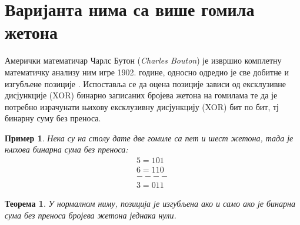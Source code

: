 \documentclass[a4paper]{article}
\newtheorem{example}{Пример}
\newtheorem{theorem}{Теорема}
\begin{document}
\section{Варијанта нима са више гомила жетона}
\label{sec:optimalna_strategija}

Амерички математичар Чарлс Бутон (\textit{Charles Bouton}) је извршио комплетну математичку анализу ним игре 1902. године, односно одредио је све добитне и изгубљене позиције \cite{carls_buton}. Испоставља се да оцена позиције зависи од ексклузивне дисјункције (XOR) бинарно записаних бројева жетона на гомилама те да је потребно израчунати њихову ексклузивну дисјункцију (XOR) бит по бит, тј бинарну суму без преноса. 

\begin{example} 
	Нека су на столу дате две гомиле са пет и шест жетона, тада је њихова бинарна сума без преноса:	
	\begin{align*}
		5 = 1 0 1\\
		6 = 1 1 0\\
		----   \\
		3 = 0 1 1
	\end{align*}
\end{example}

\begin{theorem}
	\label{thm:pobeda}
	У нормалном ниму, позиција је изгубљена ако и само ако је бинарна сума без преноса бројева жетона једнака нули.
\end{theorem}
\end{document}
